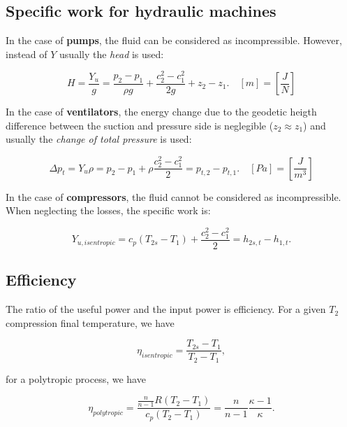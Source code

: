 \subsection{Specific work for hydraulic machines}

In the case of {\bf pumps}, the fluid can be considered as incompressible. However, instead of $Y$ usually the \emph{head} is used:

\begin{equation}
H=\frac{Y_u}{g}=\frac{p_2-p_1}{\rho g}+\frac{c_2^2-c_1^2}{2g}+z_2-z_1.\quad [m]=\left[ \frac{J}{N}\right]
\end{equation}

In the case of {\bf ventilators}, the energy change due to the geodetic heigth difference between the suction and pressure side is neglegible ($z_2 \approx z_1$) and usually the \emph{change of total pressure} is used:

\begin{equation}
\Delta p_t=Y_u \rho=p_2-p_1+\rho\frac{c_2^2-c_1^2}{2}=p_{t,2}-p_{t,1}. \quad [Pa]=\left[ \frac{J}{m^3}\right]
\end{equation}

In the case of {\bf compressors}, the fluid cannot be considered as incompressible. When neglecting the losses, the specific work is:

\begin{equation}
Y_{u,isentropic}=c_p\left(T_{2s}-T_1\right) +\frac{c_2^2-c_1^2}{2}=h_{2s,t}-h_{1,t}.
\end{equation}

\subsection{Efficiency}

The ratio of the useful power and the input power is efficiency. For a given $T_2$ compression final temperature, we have

\begin{equation}
\eta_{isentropic}=\frac{T_{2s}-T_1}{T_2-T_1},
\end{equation}

\noindent for a polytropic process, we have

\begin{equation}
\eta_{polytropic}=\frac{\frac{n}{n-1}R (T_2-T_1)}{c_p(T_2-T_1)}=\frac{n}{n-1}\frac{\kappa-1}{\kappa}.
\end{equation}




\clearpage
